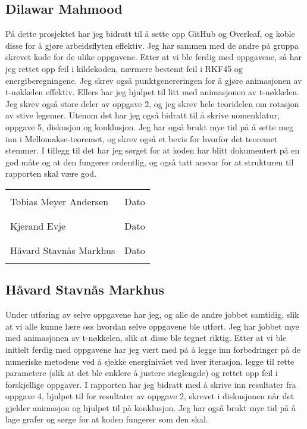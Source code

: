 \subsection{Dilawar Mahmood}
På dette prosjektet har jeg bidratt til å sette opp GitHub og Overleaf, og koble disse for å gjøre arbeidsflyten effektiv. Jeg har sammen med de andre på gruppa skrevet kode for de ulike oppgavene. Etter at vi ble ferdig med oppgavene, så har jeg rettet opp feil i kildekoden, nærmere bestemt feil i RKF45 og energiberegningene. Jeg skrev også punktgenereringen for å gjøre animasjonen av t-nøkkelen effektiv. Ellers har jeg hjulpet til litt med animasjonen av t-nøkkelen. Jeg skrev også store deler av oppgave 2, og jeg skrev hele teoridelen om rotasjon av stive legemer. Utenom det har jeg også bidratt til å skrive nomenklatur, oppgave 5, diskusjon og konklusjon. Jeg har også brukt mye tid på å sette meg inn i Mellomakse-teoremet, og skrev også et bevis for hvorfor det teoremet stemmer. I tillegg til det har jeg sørget for at koden har blitt dokumentert på en god måte og at den fungerer ordentlig, og også tatt ansvar for at strukturen til rapporten skal være god.
\vspace*{\fill}

\noindent\begin{tabular}{@{}p{2.5in}p{2.5in}@{}}
\dotfill                         & \dotfill\\
Tobias Meyer Andersen              & Dato\\
                                 & \\[8ex]
\dotfill                         & \dotfill\\
Kjerand Evje              & Dato\\
                                 & \\[8ex]
\dotfill                         & \dotfill\\
Håvard Stavnås Markhus              & Dato\\
                                 & \\[8ex]
\end{tabular}
\newpage
\subsection{Håvard Stavnås Markhus}
Under utføring av selve oppgavene har jeg, og alle de andre jobbet samtidig, slik at vi alle kunne lære oss hvordan selve oppgavene ble utført. Jeg har jobbet mye med animasjonen av t-nøkkelen, slik at disse ble tegnet riktig. Etter at vi ble initielt ferdig med oppgavene har jeg vært med på å legge inn forbedringer på de numeriske metodene ved å sjekke energinivået ved hver iterasjon, legge til rette parametere (slik at det ble enklere å justere steglengde) og rettet opp feil i forskjellige oppgaver. I rapporten har jeg bidratt med å skrive inn resultater fra oppgave 4, hjulpet til for resultater av oppgave 2, skrevet i diskusjonen når det gjelder animasjon og hjulpet til på konklusjon. Jeg har også brukt mye tid på å lage grafer og sørge for at koden fungerer som den skal.
\vspace*{\fill}

